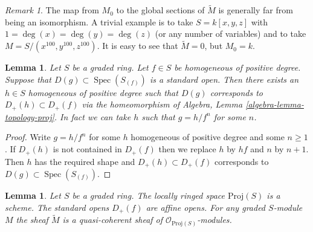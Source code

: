 \documentclass{stacks-project}
\theoremstyle{plain}
\newtheorem{lemma}[subsection]{Lemma}
\theoremstyle{definition}
\theoremstyle{remark}
\newtheorem{remark}[subsection]{Remark}
\numberwithin{equation}{subsection}
\def\Spec{\mathop{\mathrm{Spec}}}
\begin{document}
\begin{remark}
\label{remark-global-sections-not-isomorphism}
The map from $M_0$ to the global sections of $\widetilde M$
is generally far from being an isomorphism. A trivial
example is to take $S = k[x, y, z]$ with $1 = \deg(x) = \deg(y) = \deg(z)$
(or any number of variables) and to take $M = S/(x^{100}, y^{100}, z^{100})$.
It is easy to see that $\widetilde M = 0$, but $M_0 = k$.
\end{remark}

\begin{lemma}
\label{lemma-standard-open-proj}
Let $S$ be a graded ring. Let $f \in S$ be homogeneous of positive degree.
Suppose that $D(g) \subset \Spec(S_{(f)})$ is a standard open.
Then there exists an $h \in S$ homogeneous of positive degree such that
$D(g)$ corresponds to $D_{+}(h) \subset D_{+}(f)$ via the homeomorphism
of Algebra, Lemma \ref{algebra-lemma-topology-proj}. In fact we can
take $h$ such that $g = h/f^n$ for some $n$.
\end{lemma}

\begin{proof}
Write $g = h/f^n$ for some $h$ homogeneous of positive degree
and some $n \geq 1$. If $D_{+}(h)$ is not contained in
$D_{+}(f)$ then we replace $h$ by $hf$ and $n$ by $n + 1$.
Then $h$ has the required shape and $D_{+}(h) \subset D_{+}(f)$
corresponds to $D(g) \subset \Spec(S_{(f)})$.
\end{proof}

\begin{lemma}
\label{lemma-proj-scheme}
Let $S$ be a graded ring.
The locally ringed space $\text{Proj}(S)$ is a scheme.
The standard opens $D_{+}(f)$ are affine opens.
For any graded $S$-module $M$ the sheaf
$\widetilde M$ is a quasi-coherent sheaf of
$\mathcal{O}_{\text{Proj}(S)}$-modules.
\end{lemma}
\end{document}
